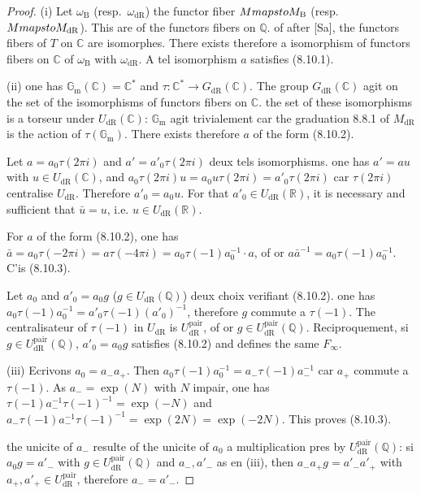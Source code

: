 \documentclass[12pt,a4paper]{article}
\theoremstyle{plain}
\theoremstyle{definition}
\theoremstyle{remark}
\newcommand{\DR}{\mathrm{dR}}
\newcommand{\B}{\mathrm{B}}
\newcommand{\Q}{\mathbb{Q}}
\newcommand{\C}{\mathbb{C}}
\newcommand{\R}{\mathbb{R}}
\newcommand{\Gm}{\mathbb{G}_\mathrm{m}}
\begin{document}
\begin{proof}
(i) Let $\omega_\B$ (resp.~$\omega_\DR$) the functor fiber $M \\mapsto M_\B$ (resp.~$M \\mapsto M_\DR$). This are of the functors fibers on $\Q$. of after [Sa], the functors fibers of $T$ on $\C$ are isomorphes. There exists therefore a isomorphism of functors fibers on $\C$ of $\omega_\B$ with $\omega_\DR$. A tel isomorphism $a$ satisfies (8.10.1).

(ii) one has $\Gm(\C) = \C^*$ and $\tau: \C^* \to G_\DR(\C)$. The group $G_\DR(\C)$ agit on the set of the isomorphisms of functors fibers on $\C$. the set of these isomorphisms is a torseur under $U_\DR(\C)$: $\Gm$ agit trivialement car the graduation 8.8.1 of $M_\DR$ is the action of $\tau(\Gm)$. There exists therefore $a$ of the form (8.10.2).

Let $a = a_0 \tau(2\pi i)$ and $a' = a'_0 \tau(2\pi i)$ deux tels isomorphisms. one has $a' = a u$ with $u \in U_\DR(\C)$, and $a_0 \tau(2\pi i) u = a_0 u \tau(2\pi i) = a'_0 \tau(2\pi i)$ car $\tau(2\pi i)$ centralise $U_\DR$. Therefore $a'_0 = a_0 u$. For that $a'_0 \in U_\DR(\R)$, it is necessary and sufficient that $\bar{u} = u$, i.e. $u \in U_\DR(\R)$.

For $a$ of the form (8.10.2), one has $\bar{a} = a_0 \tau(-2\pi i) = a \tau(-4\pi i) = a_0 \tau(-1) a_0^{-1} \cdot a$, of or $a \bar{a}^{-1} = a_0 \tau(-1) a_0^{-1}$. C'is (8.10.3).

Let $a_0$ and $a'_0 = a_0 g$ ($g \in U_\DR(\Q)$) deux choix verifiant (8.10.2). one has $a_0 \tau(-1) a_0^{-1} = a'_0 \tau(-1) (a'_0)^{-1}$, therefore $g$ commute a $\tau(-1)$. The centralisateur of $\tau(-1)$ in $U_\DR$ is $U_\DR^{\mathrm{pair}}$, of or $g \in U_\DR^{\mathrm{pair}}(\Q)$. Reciproquement, si $g \in U_\DR^{\mathrm{pair}}(\Q)$, $a'_0 = a_0 g$ satisfies (8.10.2) and defines the same $F_\infty$.

(iii) Ecrivons $a_0 = a_- a_+$. Then $a_0 \tau(-1) a_0^{-1} = a_- \tau(-1) a_-^{-1}$ car $a_+$ commute a $\tau(-1)$. As $a_- = \exp(N)$ with $N$ impair, one has $\tau(-1) a_-^{-1} \tau(-1)^{-1} = \exp(-N)$ and $a_- \tau(-1) a_-^{-1} \tau(-1)^{-1} = \exp(2N) = \exp(-2N)$. This proves (8.10.3).

the unicite of $a_-$ resulte of the unicite of $a_0$ a multiplication pres by $U_\DR^{\mathrm{pair}}(\Q)$: si $a_0 g = a'_-$ with $g \in U_\DR^{\mathrm{pair}}(\Q)$ and $a_-, a'_-$ as en (iii), then $a_- a_+ g = a'_- a'_+$ with $a_+, a'_+ \in U_\DR^{\mathrm{pair}}$, therefore $a_- = a'_-$.
\end{proof}
\end{document}
